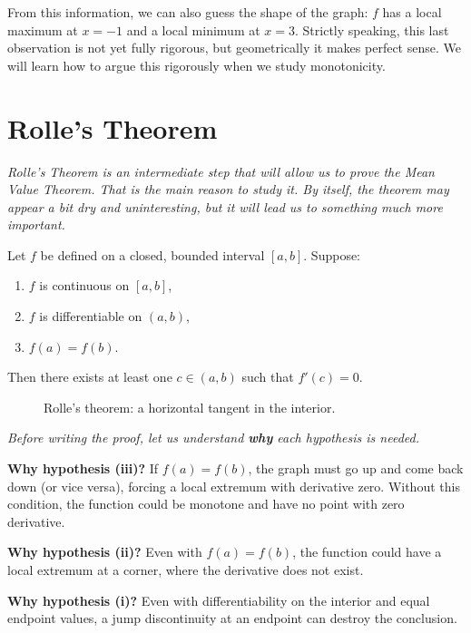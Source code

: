 \begin{example}
From this information, we can also guess the shape of the graph: $f$ has a local maximum at $x = -1$ and a local minimum at $x = 3$.  Strictly speaking, this last observation is not yet fully rigorous, but geometrically it makes perfect sense.  We will learn how to argue this rigorously when we study monotonicity.
\end{example}

\section{Rolle's Theorem}
\label{sec:5.5}

\textit{Rolle's Theorem is an intermediate step that will allow us to prove the Mean Value Theorem.  That is the main reason to study it.  By itself, the theorem may appear a bit dry and uninteresting, but it will lead us to something much more important.}

\begin{theorem}
\label{thm:5-3}
Let $f$ be defined on a closed, bounded interval $[a,b]$.  Suppose:
\begin{enumerate}[label=(\roman*)]
  \item $f$ is continuous on $[a,b]$,
  \item $f$ is differentiable on $(a,b)$,
  \item $f(a) = f(b)$.
\end{enumerate}
Then there exists at least one $c \in (a,b)$ such that $f'(c) = 0$.
\end{theorem}

\begin{figure}[ht]
  \centering
  
  \caption{Rolle's theorem: a horizontal tangent in the interior.}
  \label{fig:rolles-theorem}
\end{figure}

\textit{Before writing the proof, let us understand \textbf{why} each hypothesis is needed.}

\begin{remark}
\textbf{Why hypothesis (iii)?}  If $f(a) = f(b)$, the graph must go up and come back down (or vice versa), forcing a local extremum with derivative zero.  Without this condition, the function could be monotone and have no point with zero derivative.

\textbf{Why hypothesis (ii)?}  Even with $f(a) = f(b)$, the function could have a local extremum at a corner, where the derivative does not exist.

\textbf{Why hypothesis (i)?}  Even with differentiability on the interior and equal endpoint values, a jump discontinuity at an endpoint can destroy the conclusion.
\end{remark}

